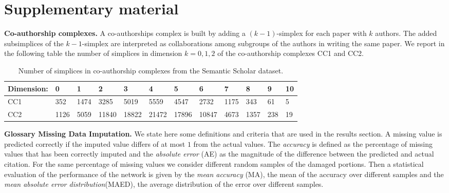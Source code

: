 \section{Supplementary material}\label{sec:supp_material}

\textbf{Co-authorship complexes.} A co-authorships complex is built by adding a $(k-1)$-simplex for each paper with $k$ authors. The added subsimplices of the $k-1$-simplex are interpreted as collaborations among subgroups of the authors in writing the same paper. We report in the following table the number of simplices in dimension $k=0,1,2$ of the co-authorship complexes CC1 and CC2.
\begin{table}[htbp]
  \centering
  \scriptsize{
  \begin{tabular}{llllllllllll}
    \cmidrule(r){1-12}
    Dimension:   & 0     & 1  & 2     & 3 & 4     & 5 & 6    & 7 & 8   & 9 & 10\\
    \midrule
    CC1 & 352  & 1474  & 3285  & 5019  & 5559  & 4547  & 2732  & 1175  & 343 & 61 & 5\\
    CC2 & 1126 & 5059 & 11840 & 18822 & 21472 & 17896  & 10847 & 4673 & 1357 & 238 & 19\\ 
    \bottomrule
  \end{tabular}}
  \vspace{2pt}
  \caption{%
  Number of simplices in co-authorship complexes from the Semantic Scholar dataset.
  } \label{table:Simplices-coauthor}
\end{table}

\textbf{Glossary Missing Data Imputation.} We state here some definitions and criteria that are used in the results section. 
A missing value is predicted correctly if the imputed value differs of at most $1$ from the actual values. 
The \emph{accuracy} is defined as the percentage of missing values that has been correctly imputed and the \emph{absolute error} (AE) as the magnitude of the difference between the predicted and actual citation.
For the same percentage of missing values we consider different random samples of the damaged portions. Then a statistical evaluation of the performance of the network is given by the \emph{mean accuracy} (MA), the mean of the accuracy over different samples and the \emph{mean absolute error distribution}(MAED), the average distribution of the error over different samples.

